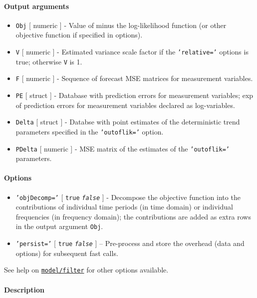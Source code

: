 \paragraph{Output arguments}

\begin{itemize}
\item
  \texttt{Obj} {[} numeric {]} - Value of minus the log-likelihood
  function (or other objective function if specified in options).
\item
  \texttt{V} {[} numeric {]} - Estimated variance scale factor if the
  \texttt{'relative='} options is true; otherwise \texttt{V} is 1.
\item
  \texttt{F} {[} numeric {]} - Sequence of forecast MSE matrices for
  measurement variables.
\item
  \texttt{PE} {[} struct {]} - Database with prediction errors for
  measurement variables; exp of prediction errors for measurement
  variables declared as log-variables.
\item
  \texttt{Delta} {[} struct {]} - Databse with point estimates of the
  deterministic trend parameters specified in the \texttt{'outoflik='}
  option.
\item
  \texttt{PDelta} {[} numeric {]} - MSE matrix of the estimates of the
  \texttt{'outoflik='} parameters.
\end{itemize}

\paragraph{Options}

\begin{itemize}
\item
  \texttt{'objDecomp='} {[} \texttt{true} \textbar{}
  \emph{\texttt{false}} {]} - Decompose the objective function into the
  contributions of individual time periods (in time domain) or
  individual frequencies (in frequency domain); the contributions are
  added as extra rows in the output argument \texttt{Obj}.
\item
  \texttt{'persist='} {[} \texttt{true} \textbar{} \emph{\texttt{false}}
  {]} -- Pre-process and store the overhead (data and options) for
  subsequent fast calls.
\end{itemize}

See help on \href{model/filter}{\texttt{model/filter}} for other options
available.

\paragraph{Description}

